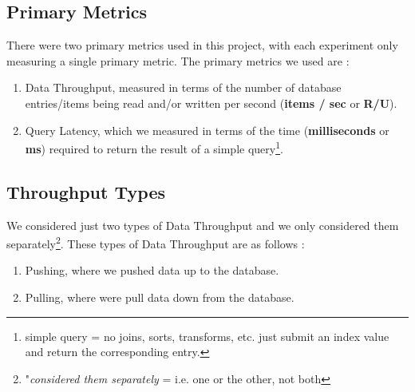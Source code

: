 
\subsection{Primary Metrics}

There were two primary metrics used in this project, with each experiment only measuring a single primary metric.  The primary metrics we used are :

\vspace{0.1in}
\begin{spacing}{1.2}
\begin{enumerate}[label=\Large{\textbf{\Alph*}):}]
	\item Data Throughput, measured in terms of the number of database entries/items being read and/or written per second (\textbf{items / sec} or \textbf{R/U}).
	\vspace{0.05in}
	\item Query Latency, which we measured in terms of the time (\textbf{milliseconds} or \textbf{ms}) required to return the result of a simple query\footnote{simple query = no joins, sorts, transforms, etc. just submit an index value and return the corresponding entry.}.
\end{enumerate}
\end{spacing}



\subsection{Throughput Types}

We considered just two types of Data Throughput and we only considered them separately\footnote{"\emph{considered them separately} = i.e. one or the other, not both}.  These types of Data Throughput are as follows :

\vspace{0.1in}
\begin{spacing}{1.2}
\begin{enumerate}[label=\Large{\textbf{\Alph*}):}]
	\item Pushing, where we pushed data up to the database.
	\vspace{0.05in}
	\item Pulling, where were pull data down from the database.
\end{enumerate}
\end{spacing}



